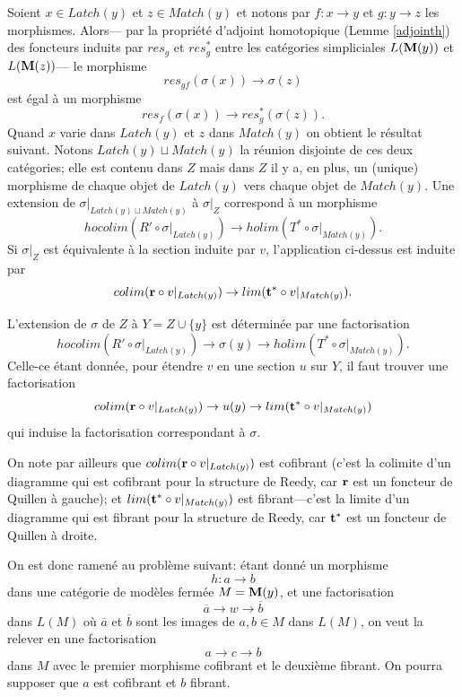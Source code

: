 \documentclass[12pt]{article}
\newcommand{\mm}{{\bf M}}
\begin{document}
Soient $x\in Latch(y)$ et $z\in Match(y)$
et notons par $f: x\rightarrow y$ et $g: y\rightarrow z$ les morphismes.
Alors---
par la propri\'et\'e d'adjoint homotopique (Lemme \ref{adjointh}) des foncteurs
induits par $res_g$ et $res_g^{\ast}$ entre les cat\'egories simpliciales $L(\mm
(y))$ et $L(\mm (z))$--- le morphisme
$$
res_{gf}(\sigma (x))\rightarrow \sigma (z)
$$
est \'egal \`a un morphisme
$$
res_f(\sigma (x)) \rightarrow res_g^{\ast} (\sigma (z)).
$$
Quand $x$ varie dans $Latch (y)$ et $z$ dans $Match (y)$ on obtient le
r\'esultat suivant.
Notons $Latch(y)\sqcup Match(y)$ la r\'eunion disjointe de ces deux
cat\'egories; elle
est contenu dans $Z$ mais dans $Z$ il y a, en plus, un (unique)
morphisme de chaque objet de $Latch(y)$ vers chaque objet de $Match(y)$.
Une extension de $\sigma |_{Latch(y)\sqcup Match(y)}$ \`a $\sigma |_Z$
correspond \`a un morphisme
$$
hocolim (R'\circ \sigma |_{Latch(y)})\rightarrow
holim (T^{\ast} \circ \sigma |_{Match(y)}).
$$
Si $\sigma |_Z$ est \'equivalente \`a la section induite par $v$, l'application
ci-dessus est induite par
$$
colim ({\bf r}\circ v|_{Latch (y)})\rightarrow
lim ({\bf t}^{\ast} \circ v|_{Match(y)}).
$$

L'extension de $\sigma$ de $Z$ \`a $Y=Z\cup \{ y\}$ est d\'etermin\'ee
par une factorisation
$$
hocolim (R'\circ \sigma |_{Latch(y)})\rightarrow \sigma (y) \rightarrow
holim (T^{\ast} \circ \sigma |_{Match(y)}).
$$
Celle-ce \'etant donn\'ee, pour \'etendre $v$ en une section $u$ sur $Y$,
il faut
trouver une factorisation
$$
colim ({\bf r}\circ v|_{Latch (y)})\rightarrow u(y)\rightarrow
lim ({\bf t}^{\ast} \circ v|_{Match(y)})
$$
qui induise la factorisation correspondant \`a $\sigma$.

On note par ailleurs que  $colim ({\bf r}\circ v|_{Latch (y)})$
est cofibrant (c'est la colimite d'un diagramme qui est cofibrant pour la
structure de Reedy, car ${\bf r}$ est un foncteur de Quillen \`a gauche);
et $lim ({\bf t}^{\ast} \circ v|_{Match(y)})$ est fibrant---c'est la limite
d'un diagramme qui est fibrant pour la structure de Reedy, car ${\bf t}^{\ast}$
est un foncteur de Quillen \`a droite.

On est donc ramen\'e au probl\`eme suivant: \'etant donn\'e un morphisme
$$
h:a\rightarrow b
$$
dans une cat\'egorie de mod\`eles ferm\'ee $M=\mm (y)$, et une factorisation
$$
\overline{a} \rightarrow w \rightarrow \overline{b}
$$
dans $L(M)$ o\`u $\overline{a}$ et $\overline{b}$ sont les images de $a,b\in M$
dans $L(M)$, on veut la relever en une factorisation
$$
a\rightarrow c \rightarrow b
$$
dans $M$ avec le premier morphisme cofibrant et le deuxi\`eme
fibrant. On pourra supposer que $a$ est cofibrant et $b$ fibrant.
\end{document}
